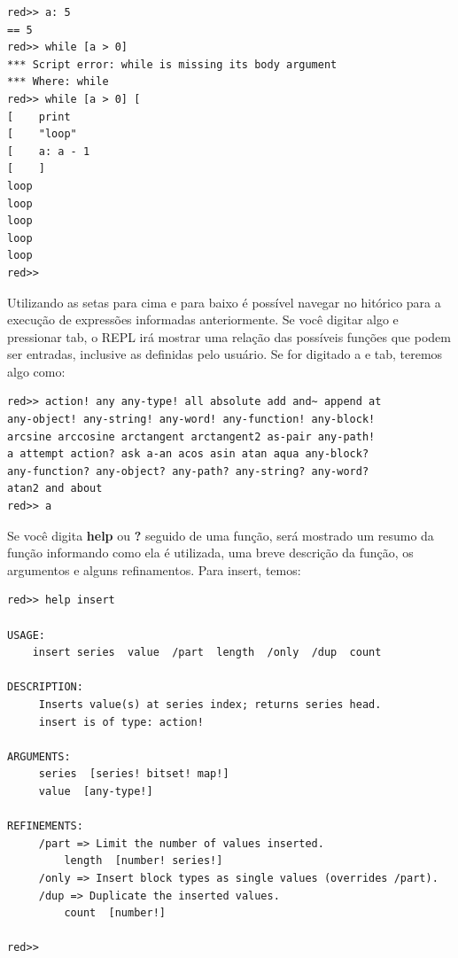 \documentclass[12pt]{article}
\begin{document}
\begin{shaded}
\begin{verbatim}
red>> a: 5
== 5
red>> while [a > 0]
*** Script error: while is missing its body argument
*** Where: while
red>> while [a > 0] [
[    print
[    "loop"
[    a: a - 1
[    ]
loop
loop
loop
loop
loop
red>> 
\end{verbatim}
\end{shaded}

Utilizando as setas para cima e para baixo é possível navegar no hitórico para a
execução de expressões informadas anteriormente. Se você digitar algo e
pressionar tab, o REPL irá mostrar uma relação das possíveis funções que podem
ser entradas, inclusive as definidas pelo usuário. Se for digitado a e tab,
teremos algo como:

\begin{shaded}
\begin{verbatim}
red>> action! any any-type! all absolute add and~ append at
any-object! any-string! any-word! any-function! any-block! 
arcsine arccosine arctangent arctangent2 as-pair any-path! 
a attempt action? ask a-an acos asin atan aqua any-block? 
any-function? any-object? any-path? any-string? any-word? 
atan2 and about 
red>> a
\end{verbatim}
\end{shaded}

Se você digita \textbf{help} ou \textbf{?} seguido de uma função, será mostrado
um resumo da função informando como ela é utilizada, uma breve descrição da
função, os argumentos e alguns refinamentos. Para insert, temos:

\begin{shaded}
\begin{verbatim}
red>> help insert

USAGE:
    insert series  value  /part  length  /only  /dup  count

DESCRIPTION:
     Inserts value(s) at series index; returns series head. 
     insert is of type: action!

ARGUMENTS:
     series  [series! bitset! map!]
     value  [any-type!]

REFINEMENTS:
     /part => Limit the number of values inserted.
         length  [number! series!]
     /only => Insert block types as single values (overrides /part).
     /dup => Duplicate the inserted values.
         count  [number!]

red>> 
\end{verbatim}
\end{shaded}
\end{document}
